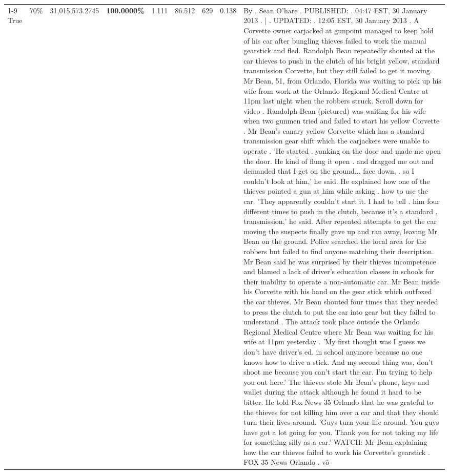 \begin{table}[H]
\begin{tabular}{lllrlllll}
\cline{1-9} \cline{2-9}
True & 70\% & 31,015,573.2745 & \bfseries \color{red} 100.0000\% & 1.111 & 86.512 & 629 & 0.138 & By . Sean O'hare . PUBLISHED: . 04:47 EST, 30 January 2013 . | . UPDATED: . 12:05 EST, 30 January 2013 . A Corvette owner carjacked at gunpoint managed to keep hold of his car after bungling thieves failed to work the manual gearstick and fled. Randolph Bean repeatedly shouted at the car thieves to push in the clutch of his bright yellow, standard transmission Corvette, but they still failed to get it moving. Mr Bean, 51, from Orlando, Florida was waiting to pick up his wife from work at the Orlando Regional Medical Centre at 11pm last night when the robbers struck. Scroll down for video . Randolph Bean (pictured) was waiting for his wife when two gunmen tried and failed to start his yellow Corvette . Mr Bean's canary yellow Corvette which has a standard transmission gear shift which the carjackers were unable to operate . 'He started . yanking on the door and made me open the door. He kind of flung it open . and dragged me out and demanded that I get on the ground... face down, . so I couldn't look at him,' he said. He explained how one of the thieves pointed a gun at him while asking . how to use the car. 'They apparently couldn't start it. I had to tell . him four different times to push in the clutch, because it's a standard . transmission,' he said. After repeated attempts to get the car moving the suspects finally gave up and ran away, leaving Mr Bean on the ground. Police searched the local area for the robbers but failed to find anyone matching their description. Mr Bean said he was surprised by their thieves incompetence and blamed a lack of driver's education classes in schools for their inability to operate a non-automatic car. Mr Bean inside his Corvette with his hand on the gear stick which outfoxed the car thieves. Mr Bean shouted four times that they needed to press the clutch to put the car into gear but they failed to understand . The attack took place outside the Orlando Regional Medical Centre where Mr Bean was waiting for his wife at 11pm yesterday . 'My first thought was I guess we don't have driver's ed. in school anymore because no one knows how to drive a stick. And my second thing was, don't shoot me because you can't start the car. I'm trying to help you out here.' The thieves stole Mr Bean's phone, keys and wallet during the attack although he found it hard to be bitter. He told Fox News 35 Orlando that he was grateful to the thieves for not killing him over a car and that they should turn their lives around. 'Guys turn your life around. You guys have got a lot going for you. Thank you for not taking my life for something silly as a car.' WATCH: Mr Bean explaining how the car thieves failed to work his Corvette's gearstick . FOX 35 News Orlando . vô \\

\end{tabular}
\end{table}
